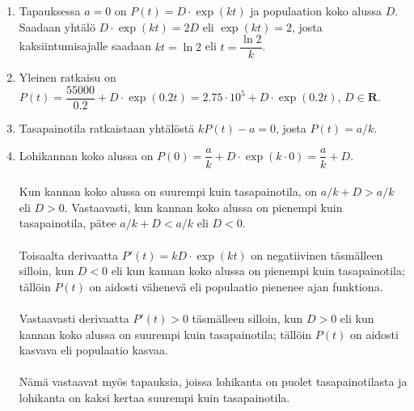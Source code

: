 \documentclass[12pt,fleqn]{article}
\begin{document}
\begin{enumerate}[label=\textbf{\arabic*.}]
\begin{enumerate}[label=\textbf{\alph*)}]
\item Tapauksessa \(a=0\) on \(P(t)=D\cdot \exp(kt)\) ja populaation koko alussa \(D\). Saadaan yhtälö \(D\cdot \exp(kt)=2D\) eli \(\exp(kt)=2\), josta kaksiintumisajalle saadaan \(kt=\ln 2\) eli \(t=\dfrac{\ln 2}{k}\).

\item Yleinen ratkaisu on \(P(t)=\dfrac{55000}{0.2}+D\cdot \exp(0.2t)=2.75\cdot 10^5 +D\cdot \exp(0.2t)\), \(D\in \mathbf{R}\).

\item Tasapainotila ratkaistaan yhtälöstä \(kP(t)-a=0\), josta \(P(t)=a/k\).

\item Lohikannan koko alussa on \(P(0)=\dfrac{a}{k}+D\cdot \exp(k\cdot 0)=\dfrac{a}{k}+D\).\\
 \\
Kun kannan koko alussa on suurempi kuin tasapainotila, on \(a/k+D>a/k\) eli \(D>0\). Vastaavasti, kun kannan koko alussa on pienempi kuin tasapainotila, pätee \(a/k+D<a/k\) eli \(D<0\).\\
 \\
Toisaalta derivaatta \(P'(t)=kD\cdot \exp(kt)\) on negatiivinen täsmälleen silloin, kun \(D<0\) eli kun kannan koko alussa on pienempi kuin tasapainotila; tällöin \(P(t)\) on aidosti vähenevä eli populaatio pienenee ajan funktiona.\\
 \\
Vastaavasti derivaatta \(P'(t)>0\) täsmälleen silloin, kun \(D>0\) eli kun kannan koko alussa on suurempi kuin tasapainotila; tällöin \(P(t)\) on aidosti kasvava eli populaatio kasvaa.\\
 \\
Nämä vastaavat myös tapauksia, joissa lohikanta on puolet tasapainotilasta ja lohikanta on kaksi kertaa suurempi kuin tasapainotila.

\end{enumerate}
\end{enumerate}

\newpage
\end{document}
